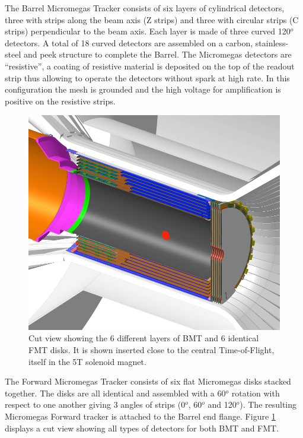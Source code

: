 The Barrel Micromegas Tracker consists of six layers of cylindrical detectors, three with strips along the beam axis (Z 
strips) and three with circular strips (C strips) perpendicular to the beam axis. Each layer is made of three curved 
120$^o$ detectors. A total of 18 curved detectors are assembled on a carbon, stainless-steel and peek structure to 
complete the Barrel. The Micromegas detectors are ``resistive'', a coating of resistive material is deposited on the 
top of the readout strip thus allowing to operate the detectors without spark at high rate. In this configuration the 
mesh is grounded and the high voltage for amplification is positive on the resistive strips.

\begin{figure}[htb]
 \includegraphics[width=1.0\columnwidth,keepaspectratio]{images/fig1}
 \caption{Cut view showing the 6 different layers of BMT and 6 identical FMT disks. It is shown inserted close to the 
central Time-of-Flight, itself in the 5T solenoid magnet.}
 \label{fig:mm-fig1}
\end{figure}

The Forward Micromegas Tracker consists of six flat Micromegas disks stacked together. The disks are all identical and 
assembled with a 60$^o$ rotation with respect to one another giving 3 angles of strips (0$^o$, 60$^o$ and 120$^o$). The 
resulting Micromegas Forward tracker is attached to the Barrel end flange. Figure \ref{fig:mm-fig1} displays a cut view 
showing all types of detectors for both BMT and FMT.

